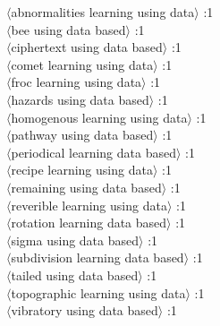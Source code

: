 \documentclass[11pt,a4paper,fleqn]{article}
\begin{document}
\begin{multicols}{2} \noindent
$\langle$abnormalities learning using data$\rangle$ :1\\
$\langle$bee using data based$\rangle$ :1\\
$\langle$ciphertext using data based$\rangle$ :1\\
$\langle$comet learning using data$\rangle$ :1\\
$\langle$froc learning using data$\rangle$ :1\\
$\langle$hazards using data based$\rangle$ :1\\
$\langle$homogenous learning using data$\rangle$ :1\\
$\langle$pathway using data based$\rangle$ :1\\
$\langle$periodical learning data based$\rangle$ :1\\
$\langle$recipe learning using data$\rangle$ :1\\
$\langle$remaining using data based$\rangle$ :1\\
$\langle$reverible learning using data$\rangle$ :1\\
$\langle$rotation learning data based$\rangle$ :1\\
$\langle$sigma using data based$\rangle$ :1\\
$\langle$subdivision learning data based$\rangle$ :1\\
$\langle$tailed using data based$\rangle$ :1\\
$\langle$topographic learning using data$\rangle$ :1\\
$\langle$vibratory using data based$\rangle$ :1\\
\end{multicols} \noindent
\end{document}
